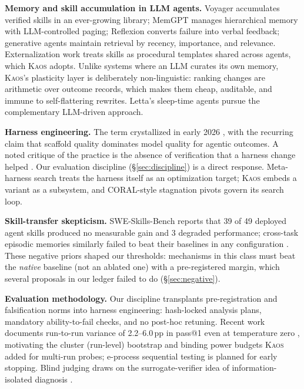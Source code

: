 \documentclass[11pt]{article}
\newcommand{\kaos}{\textsc{Kaos}}
\begin{document}
\textbf{Memory and skill accumulation in LLM agents.} Voyager \citep{wang2023voyager} accumulates verified skills in an ever-growing library; MemGPT \citep{packer2023memgpt} manages hierarchical memory with LLM-controlled paging; Reflexion \citep{shinn2023reflexion} converts failure into verbal feedback; generative agents \citep{park2023generative} maintain retrieval by recency, importance, and relevance. Externalization work \citep{zhou2026externalization} treats skills as procedural templates shared across agents, which \kaos{} adopts. Unlike systems where an LLM curates its own memory, \kaos{}'s plasticity layer is deliberately non-linguistic: ranking changes are arithmetic over outcome records, which makes them cheap, auditable, and immune to self-flattering rewrites. Letta's sleep-time agents \citep{packer2023memgpt} pursue the complementary LLM-driven approach.

\textbf{Harness engineering.} The term crystallized in early 2026 \citep{hashimoto2026journey, osmani2026harness}, with the recurring claim that scaffold quality dominates model quality for agentic outcomes. A noted critique of the practice is the absence of verification that a harness change helped \citep{bockeler2026harness}. Our evaluation discipline (\S\ref{sec:discipline}) is a direct response. Meta-harness search \citep{metaharness2026} treats the harness itself as an optimization target; \kaos{} embeds a variant as a subsystem, and CORAL-style stagnation pivots \citep{coral2026} govern its search loop.

\textbf{Skill-transfer skepticism.} SWE-Skills-Bench \citep{sweskills2026} reports that 39 of 49 deployed agent skills produced no measurable gain and 3 degraded performance; cross-task episodic memories similarly failed to beat their baselines in any configuration \citep{ctimrover2025}. These negative priors shaped our thresholds: mechanisms in this class must beat the \emph{native} baseline (not an ablated one) with a pre-registered margin, which several proposals in our ledger failed to do (\S\ref{sec:negative}).

\textbf{Evaluation methodology.} Our discipline transplants pre-registration and falsification norms \citep{popper1959logic} into harness engineering: hash-locked analysis plans, mandatory ability-to-fail checks, and no post-hoc retuning. Recent work documents run-to-run variance of 2.2--6.0\,pp in pass@1 even at temperature zero \citep{multirun2026}, motivating the cluster (run-level) bootstrap and binding power budgets \kaos{} added for multi-run probes; e-process sequential testing \citep{eprocess2025} is planned for early stopping. Blind judging draws on the surrogate-verifier idea of information-isolated diagnosis \citep{evoskills2026}.
\end{document}
